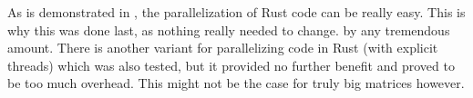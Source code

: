 As is demonstrated in , the parallelization of Rust code can
be really easy. This is why this was done last, as nothing really needed to
change. by any tremendous amount. There is another variant for parallelizing
code in Rust (with explicit threads) which was also tested, but it provided no
further benefit and proved to be too much overhead. This might not be the case
for truly big matrices however.


